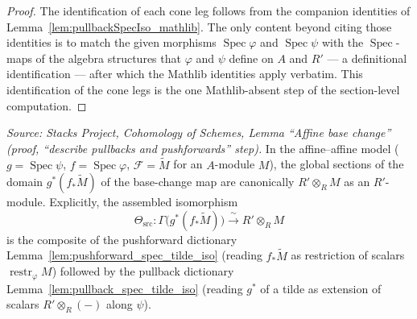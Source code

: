 \begin{proof}
  The identification of each cone leg follows from the companion identities of
  Lemma~\ref{lem:pullbackSpecIso_mathlib}. The only content beyond citing those
  identities is to match the given morphisms \(\operatorname{Spec}\varphi\) and
  \(\operatorname{Spec}\psi\) with the \(\operatorname{Spec}\)-maps of the algebra
  structures that \(\varphi\) and \(\psi\) define on \(A\) and \(R'\) — a definitional
  identification — after which the Mathlib identities apply verbatim. This identification
  of the cone legs is the one Mathlib-absent step of the section-level computation.
\end{proof}

\begin{lemma}


  \label{lem:base_change_mate_domain_read}
  \textit{Source: Stacks Project, Cohomology of Schemes, Lemma ``Affine base
  change'' (proof, ``describe pullbacks and pushforwards'' step).}
  In the affine--affine model (\(g = \operatorname{Spec}\psi\),
  \(f = \operatorname{Spec}\varphi\), \(\mathcal{F} = \widetilde M\) for an
  \(A\)-module \(M\)), the global sections of the domain \(g^*(f_*\widetilde M)\) of the
  base-change map are canonically \(R' \otimes_R M\) as an \(R'\)-module. Explicitly,
  the assembled isomorphism
  \[
    \Theta_{\mathrm{src}} :
    \Gamma\bigl(g^*(f_*\widetilde M)\bigr) \xrightarrow{\ \sim\ } R' \otimes_R M
  \]
  is the composite of the pushforward dictionary
  Lemma~\ref{lem:pushforward_spec_tilde_iso} (reading \(f_*\widetilde M\) as
  restriction of scalars \(\operatorname{restr}_\varphi M\)) followed by the pullback
  dictionary Lemma~\ref{lem:pullback_spec_tilde_iso} (reading \(g^*\) of a tilde as
  extension of scalars \(R' \otimes_R (-)\) along \(\psi\)).
\end{lemma}

